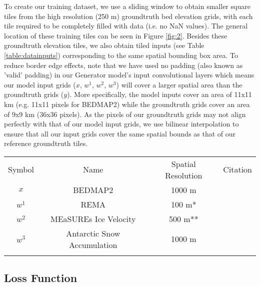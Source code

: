 \documentclass[tc, manuscript]{copernicus}
\begin{document}
To create our training dataset, we use a sliding window to obtain smaller square tiles from the high resolution (250 m) groundtruth bed elevation grids, with each tile required to be completely filled with data (i.e. no NaN values).
The general location of these training tiles can be seen in Figure \ref{fig:2}.
Besides these groundtruth elevation tiles, we also obtain tiled inputs (see Table \ref{table:datainputs}) corresponding to the same spatial bounding box area.
To reduce border edge effects, note that we have used no padding (also known as 'valid' padding) in our Generator model's input convolutional layers which means our model input grids ($x$, $w^1$, $w^2$, $w^3$) will cover a larger spatial area than the groundtruth grids ($y$).
More specifically, the model inputs cover an area of 11x11 km (e.g. 11x11 pixels for BEDMAP2) while the groundtruth grids cover an area of 9x9 km (36x36 pixels).
As the pixels of our groundtruth grids may not align perfectly with that of our model input grids, we use bilinear interpolation to ensure that all our input grids cover the same spatial bounds as that of our reference groundtruth tiles.

\begin{table*}[ht]
  \caption{Remote Sensing dataset inputs into the DeepBedMap neural network model.}
  \label{table:datainputs}
  \begin{tabular}{cccc}
  \tophline
  Symbol & Name & Spatial Resolution & Citation \\
  \middlehline
  $x$ & BEDMAP2 & 1000 m & \cite{FretwellBedmap2improvedice2013} \\
  $w^1$ & REMA & 100 m* & \cite{HowatReferenceElevationModel2019} \\
  $w^2$ & MEaSUREs Ice Velocity & 500 m** & \cite{MouginotContinentwideinterferometric2019} \\
  $w^3$ & Antarctic Snow Accumulation & 1000 m & \cite{ArthernAntarcticsnowaccumulation2006} \\
  \bottomhline
  \end{tabular}
\end{table*}

\subsection{Loss Function}
\end{document}
